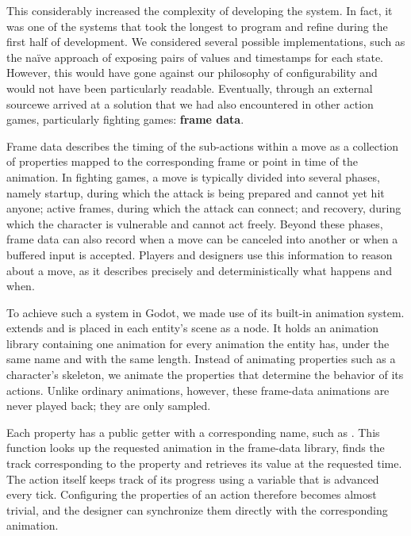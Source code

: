 \documentclass[../Main.tex]{subfiles}
\begin{document}
This considerably increased the complexity of developing the system. In fact, it was one of the systems that took the longest to program and refine during the first half of development. We considered several possible implementations, such as the naïve approach of exposing pairs of values and timestamps for each state. However, this would have gone against our philosophy of configurability and would not have been particularly readable. Eventually, through an external source\autocite[]{fairfight_godotcharacters}we arrived at a solution that we had also encountered in other action games, particularly fighting games: \textbf{frame data}.

Frame data describes the timing of the sub-actions within a move as a collection of properties mapped to the corresponding frame or point in time of the animation. In fighting games, a move is typically divided into several phases, namely startup, during which the attack is being prepared and cannot yet hit anyone; active frames, during which the attack can connect; and recovery, during which the character is vulnerable and cannot act freely. Beyond these phases, frame data can also record when a move can be canceled into another or when a buffered input is accepted. Players and designers use this information to reason about a move, as it describes precisely and deterministically what happens and when\autocite[]{srk_sf6gamedata}.

To achieve such a system in Godot, we made use of its built-in animation system.  extends  and is placed in each entity's scene as a node. It holds an animation library containing one animation for every animation the entity has, under the same name and with the same length. Instead of animating properties such as a character's skeleton, we animate the properties that determine the behavior of its actions. Unlike ordinary animations, however, these frame-data animations are never played back; they are only sampled.

Each property has a public getter with a corresponding name, such as  \linebreak{}. This function looks up the requested animation in the frame-data library, finds the track corresponding to the property and retrieves its value at the requested time. The action itself keeps track of its progress using a variable that is advanced every tick. Configuring the properties of an action therefore becomes almost trivial, and the designer can synchronize them directly with the corresponding animation.
\end{document}
